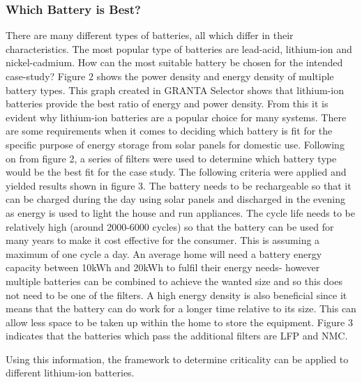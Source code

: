 \documentclass{article}
\begin{document}
\subsubsection{Which Battery is Best?}

There are many different types of batteries, all which differ in their characteristics. The most popular type of batteries are lead-acid, lithium-ion and nickel-cadmium. How can the most suitable battery be chosen for the intended case-study? Figure 2 shows the power density and energy density of multiple battery types. This graph created in GRANTA Selector shows that lithium-ion batteries provide the best ratio of energy and power density. From this it is evident why lithium-ion batteries are a popular choice for many systems. There are some requirements when it comes to deciding which battery is fit for the specific purpose of energy storage from solar panels for domestic use. Following on from figure 2, a series of filters were used to determine which battery type would be the best fit for the case study. The following criteria were applied and yielded results shown in figure 3. The battery needs to be rechargeable so that it can be charged during the day using solar panels and discharged in the evening as energy is used to light the house and run appliances. The cycle life needs to be relatively high (around 2000-6000 cycles) so that the battery can be used for many years to make it cost effective for the consumer. This is assuming a maximum of one cycle a day. An average home will need a battery energy capacity between 10kWh and 20kWh to fulfil their energy needs- however multiple batteries can be combined to achieve the wanted size and so this does not need to be one of the filters. A high energy density is also beneficial since it means that the battery can do work for a longer time relative to its size. This can allow less space to be taken up within the home to store the equipment. Figure 3 indicates that the batteries which pass the additional filters are LFP and NMC. 

Using this information, the framework to determine criticality can be applied to different lithium-ion batteries. 
\end{document}
